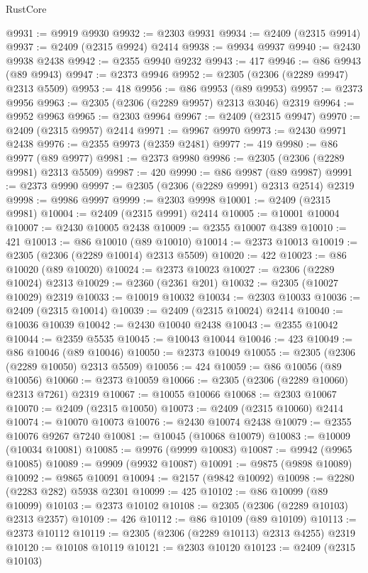 \begin{lexlean}{RustCore}
\begin{coremodule}
@9931 := @9919 @9930
@9932 := @2303 @9931
@9934 := @2409 (@2315 @9914)
@9937 := @2409 (@2315 @9924) @2414
@9938 := @9934 @9937
@9940 := @2430 @9938 @2438
@9942 := @2355 @9940 @9232
@9943 := 417
@9946 := @86 @9943 (@89 @9943)
@9947 := @2373 @9946
@9952 := @2305 (@2306 (@2289 @9947) @2313 @5509)
@9953 := 418
@9956 := @86 @9953 (@89 @9953)
@9957 := @2373 @9956
@9963 := @2305 (@2306 (@2289 @9957) @2313 @3046) @2319
@9964 := @9952 @9963
@9965 := @2303 @9964
@9967 := @2409 (@2315 @9947)
@9970 := @2409 (@2315 @9957) @2414
@9971 := @9967 @9970
@9973 := @2430 @9971 @2438
@9976 := @2355 @9973 (@2359 @2481)
@9977 := 419
@9980 := @86 @9977 (@89 @9977)
@9981 := @2373 @9980
@9986 := @2305 (@2306 (@2289 @9981) @2313 @5509)
@9987 := 420
@9990 := @86 @9987 (@89 @9987)
@9991 := @2373 @9990
@9997 := @2305 (@2306 (@2289 @9991) @2313 @2514) @2319
@9998 := @9986 @9997
@9999 := @2303 @9998
@10001 := @2409 (@2315 @9981)
@10004 := @2409 (@2315 @9991) @2414
@10005 := @10001 @10004
@10007 := @2430 @10005 @2438
@10009 := @2355 @10007 @4389
@10010 := 421
@10013 := @86 @10010 (@89 @10010)
@10014 := @2373 @10013
@10019 := @2305 (@2306 (@2289 @10014) @2313 @5509)
@10020 := 422
@10023 := @86 @10020 (@89 @10020)
@10024 := @2373 @10023
@10027 := @2306 (@2289 @10024) @2313
@10029 := @2360 (@2361 @201)
@10032 := @2305 (@10027 @10029) @2319
@10033 := @10019 @10032
@10034 := @2303 @10033
@10036 := @2409 (@2315 @10014)
@10039 := @2409 (@2315 @10024) @2414
@10040 := @10036 @10039
@10042 := @2430 @10040 @2438
@10043 := @2355 @10042
@10044 := @2359 @5535
@10045 := @10043 @10044
@10046 := 423
@10049 := @86 @10046 (@89 @10046)
@10050 := @2373 @10049
@10055 := @2305 (@2306 (@2289 @10050) @2313 @5509)
@10056 := 424
@10059 := @86 @10056 (@89 @10056)
@10060 := @2373 @10059
@10066 := @2305 (@2306 (@2289 @10060) @2313 @7261) @2319
@10067 := @10055 @10066
@10068 := @2303 @10067
@10070 := @2409 (@2315 @10050)
@10073 := @2409 (@2315 @10060) @2414
@10074 := @10070 @10073
@10076 := @2430 @10074 @2438
@10079 := @2355 @10076 @9267 @7240
@10081 := @10045 (@10068 @10079)
@10083 := @10009 (@10034 @10081)
@10085 := @9976 (@9999 @10083)
@10087 := @9942 (@9965 @10085)
@10089 := @9909 (@9932 @10087)
@10091 := @9875 (@9898 @10089)
@10092 := @9865 @10091
@10094 := @2157 (@9842 @10092)
@10098 := @2280 (@2283 @282) @5938 @2301
@10099 := 425
@10102 := @86 @10099 (@89 @10099)
@10103 := @2373 @10102
@10108 := @2305 (@2306 (@2289 @10103) @2313 @2357)
@10109 := 426
@10112 := @86 @10109 (@89 @10109)
@10113 := @2373 @10112
@10119 := @2305 (@2306 (@2289 @10113) @2313 @4255) @2319
@10120 := @10108 @10119
@10121 := @2303 @10120
@10123 := @2409 (@2315 @10103)

\end{coremodule}
\end{lexlean}
